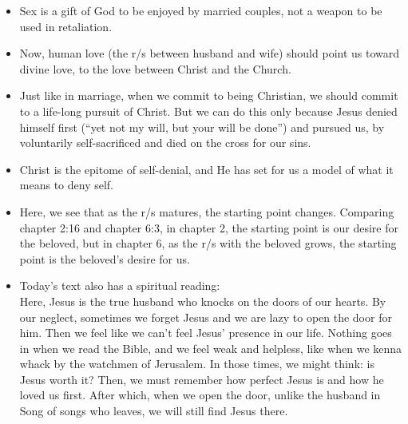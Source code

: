 \begin{itemize}
{\begin{itemize}
    \item{Sex is a gift of God to be enjoyed by married couples, not a weapon to be used in retaliation.}
    \item{Now, human love (the r/s between husband and wife) should point us toward divine love, to the love between Christ and the Church.}
    \item{Just like in marriage, when we commit to being Christian, we should commit to a life-long pursuit of Christ. But we can do this only because Jesus denied himself first (“yet not my will, but your will be done”) and pursued us, by voluntarily self-sacrificed and died on the cross for our sins.}
    \item{Christ is the epitome of self-denial, and He has set for us a model of what it means to deny self. }
    \item{Here, we see that as the r/s matures, the starting point changes. Comparing chapter 2:16 and chapter 6:3, in chapter 2, the starting point is our desire for the beloved, but in chapter 6, as the r/s with the beloved grows, the starting point is the beloved’s desire for us.}
    \item{Today's text also has a spiritual reading:\\
    Here, Jesus is the true husband who knocks on the doors of our hearts. By our neglect, sometimes we forget Jesus and we are lazy to open the door for him. Then we feel like we can’t feel Jesus’ presence in our life. Nothing goes in when we read the Bible, and we feel weak and helpless, like when we kenna whack by the watchmen of Jerusalem. In those times, we might think: is Jesus worth it? Then, we must remember how perfect Jesus is and how he loved us first. After which, when we open the door, unlike the husband in Song of songs who leaves, we will still find Jesus there.}
  \end{itemize}}
\end{itemize}